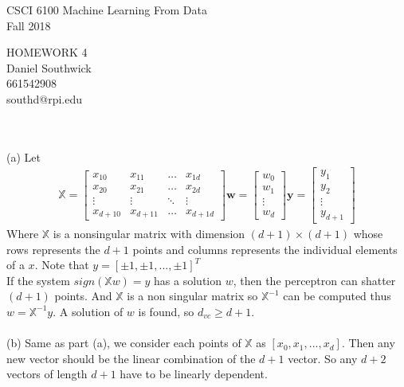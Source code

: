 \documentclass[12pt]{article}
\begin{document}
\begin{center}
CSCI 6100 Machine Learning From Data\\
Fall 2018\\
\end{center}
\begin{center}
HOMEWORK 4\\
Daniel Southwick\\
661542908\\
southd@rpi.edu
\end{center}
\vspace{.1in}

 \\\\
\indent (a) Let \begin{align*} \displaystyle
			\mathbb{X} 
			= \left[\begin{array}{cccc}
			x_{10} & x_{11} & \dots & x_{1d} \\
			x_{20} & x_{21} & \dots & x_{2d} \\
			\vdots & \vdots & \ddots & \vdots \\
			x_{{d+1}0} & x_{{d+1}1} & \dots & x_{{d+1}d} 
			\end{array}\right]
			\textbf{w} 
			= \left[\begin{array}{c}
			w_0\\w_1\\\vdots\\w_d
			\end{array}\right] 	
			\textbf{y} = 
			\left[\begin{array}{c}
			y_1\\y_2\\\vdots\\y_{d+1}
			\end{array}\right]
			\end{align*}
\indent Where $\mathbb{X}$ is a nonsingular matrix with dimension $(d+1)\times(d+1)$ whose rows represents the $d+1$ points and columns represents the individual elements of a $x$. Note that $y = [\pm1,\pm1,...,\pm1]^T$\\ 
\indent If the system $sign(\mathbb{X}w)=y$ has a solution $w$, then the perceptron can shatter $(d+1)$ points. And $\mathbb{X}$ is a non singular matrix so $\mathbb{X}^{-1}$ can be computed thus $w = \mathbb{X}^{-1}y$. A solution of $w$ is found, so $d_{vc} \geq d + 1$.\\\\
\indent (b) Same as part (a), we consider each points of $\mathbb{X}$ as $[x_0,x_1,...,x_d]$. Then any new vector should be the linear combination of the $d+1$ vector. So any $d+2$ vectors of length $d+1$ have to be linearly dependent.\\
\end{document}
